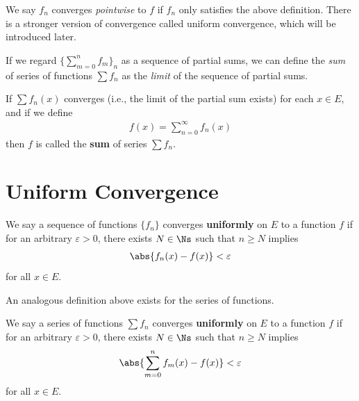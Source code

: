 \documentclass[thmcnt=section, 12pt]{elegantbook}
\begin{document}
\par We say $f_n$ converges \textit{pointwise} to $f$ if $f_n$ only satisfies the above definition. There is a stronger version of convergence called uniform convergence, which will be introduced later.

\par If we regard $\{\sum_{m=0}^{n} f_m\}_n$ as a sequence of partial sums, we can define the \textit{sum} of series of functions $\sum f_n$ as the \textit{limit} of the sequence of partial sums.

\begin{definition} \label{def:2}
    If $\sum f_n(x)$ converges (i.e., the limit of the partial sum exists) for each $x \in E$, and if we define 
    \begin{align*}
        f(x) = \sum_{n=0}^{\infty} f_n(x)
    \end{align*} 
    then $f$ is called the \textbf{sum} of series $\sum f_n$.
\end{definition}


\section{Uniform Convergence}


\begin{definition} \label{def:3}
    We say a sequence of functions $\{f_n\}$ converges \textbf{uniformly} on $E$ to a function $f$ if for an arbitrary $\varepsilon > 0$, there exists $N \in \Ns$ such that $n \geq N$ implies 
    \begin{align*}
        \abs{f_n(x) - f(x)} < \varepsilon
    \end{align*}
    for all $x \in E$.
\end{definition}


\par An analogous definition above exists for the series of functions.

\begin{definition} \label{def:4}
    We say a series of functions $\sum f_n$ converges \textbf{uniformly} on $E$ to a function $f$ if for an arbitrary $\varepsilon > 0$, there exists $N \in \Ns$ such that $n \geq N$ implies 
    \begin{align*}
        \abs{\sum_{m=0}^{n} f_m(x) - f(x)} < \varepsilon
    \end{align*}
    for all $x \in E$.
\end{definition}
\end{document}
